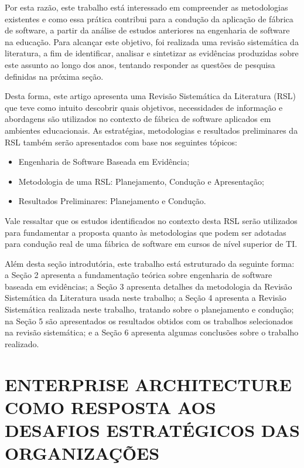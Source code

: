 Por esta razão, este trabalho está interessado em compreender as metodologias existentes e como essa prática contribui para a condução da aplicação de fábrica de software, a partir da análise de estudos anteriores na engenharia de software na educação. Para alcançar este objetivo, foi realizada uma revisão sistemática da literatura, a fim de identificar, analisar e sintetizar as evidências produzidas sobre este assunto ao longo dos anos, tentando responder as questões de pesquisa definidas na próxima seção.

Desta forma, este artigo apresenta uma Revisão Sistemática da Literatura (RSL) que teve como intuito descobrir quais objetivos, necessidades de informação e abordagens são utilizados no contexto de fábrica de software aplicados em ambientes educacionais. As estratégias, metodologias e resultados preliminares da RSL também serão apresentados com base nos seguintes tópicos:

\begin{itemize}
    \item Engenharia de Software Baseada em Evidência;
    \item Metodologia de uma RSL: Planejamento, Condução e Apresentação;
    \item Resultados Preliminares: Planejamento e Condução.
\end{itemize}

Vale ressaltar que os estudos identificados no contexto desta RSL serão utilizados para fundamentar a proposta quanto às metodologias que podem ser adotadas para condução real de uma fábrica de software em cursos de nível superior de TI.

Além desta seção introdutória, este trabalho está estruturado da seguinte forma: a Seção 2 apresenta a fundamentação teórica sobre engenharia de software baseada em evidências; a Seção 3 apresenta detalhes da metodologia da Revisão Sistemática da Literatura usada neste trabalho; a Seção 4 apresenta a Revisão Sistemática realizada neste trabalho, tratando sobre o planejamento e condução; na Seção 5 são apresentados os resultados obtidos com os trabalhos selecionados na revisão sistemática; e a Seção 6 apresenta algumas conclusões sobre o trabalho realizado.



\section{ENTERPRISE ARCHITECTURE COMO RESPOSTA AOS DESAFIOS ESTRATÉGICOS DAS ORGANIZAÇÕES}

